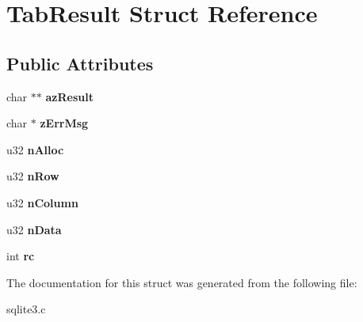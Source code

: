 \hypertarget{structTabResult}{}\section{Tab\+Result Struct Reference}
\label{structTabResult}
\subsection*{Public Attributes}
\begin{DoxyCompactItemize}
\item 
char $\ast$$\ast$ {\bfseries az\+Result}\hypertarget{structTabResult_a7446a22a7b39c17e447c65ba200490a6}{}\label{structTabResult_a7446a22a7b39c17e447c65ba200490a6}

\item 
char $\ast$ {\bfseries z\+Err\+Msg}\hypertarget{structTabResult_a6e7104bb622be05f16b6470dbb68a6c7}{}\label{structTabResult_a6e7104bb622be05f16b6470dbb68a6c7}

\item 
u32 {\bfseries n\+Alloc}\hypertarget{structTabResult_a9d07a6698e6b0293cf26fa3d39d222ea}{}\label{structTabResult_a9d07a6698e6b0293cf26fa3d39d222ea}

\item 
u32 {\bfseries n\+Row}\hypertarget{structTabResult_a0c2a87855e7665334ec4f39cc4e2fe8b}{}\label{structTabResult_a0c2a87855e7665334ec4f39cc4e2fe8b}

\item 
u32 {\bfseries n\+Column}\hypertarget{structTabResult_a34f54427ffc26de952a3df8fd50a3cca}{}\label{structTabResult_a34f54427ffc26de952a3df8fd50a3cca}

\item 
u32 {\bfseries n\+Data}\hypertarget{structTabResult_a15ec3f09bc4ccc6945c2e76bf32cf457}{}\label{structTabResult_a15ec3f09bc4ccc6945c2e76bf32cf457}

\item 
int {\bfseries rc}\hypertarget{structTabResult_a44bb015ce660ed3f987e324919d73f4d}{}\label{structTabResult_a44bb015ce660ed3f987e324919d73f4d}

\end{DoxyCompactItemize}


The documentation for this struct was generated from the following file\+:\begin{DoxyCompactItemize}
\item 
sqlite3.\+c\end{DoxyCompactItemize}
